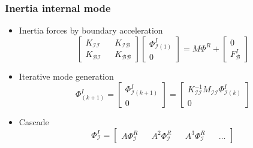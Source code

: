 \documentclass[serif,mathserif, 12pt]{beamer}
\begin{document}
\begin{frame}
  \frametitle{Inertia internal mode}
  \begin{itemize}
  \item Inertia forces by boundary acceleration
    \begin{equation*}
      \begin{bmatrix}
        K_{\mathcal{II}} && K_{\mathcal{IB}} \\
        K_{\mathcal{BI}} && K_{\mathcal{BB}}
      \end{bmatrix}
      \begin{bmatrix}
        \Phi_{\mathcal{I}(1)}^I \\
        0
      \end{bmatrix}
      =
      M\Phi^R+
      \begin{bmatrix}
        0 \\
        F_\mathcal{B}^I
      \end{bmatrix}
    \end{equation*}
  \item Iterative mode generation
    \begin{equation*}
      \Phi_{(k+1)}^I =
      \begin{bmatrix}
        \Phi^I_{\mathcal{I}(k+1)} \\
        0
      \end{bmatrix}
      =
      \begin{bmatrix}
        K^{-1}_{\mathcal{II}}M_{\mathcal{II}}\Phi^I_{\mathcal{I}(k)} \\
        0
      \end{bmatrix}
    \end{equation*}
  \item Cascade
    \begin{equation*}
      \Phi_{\mathcal{I}}^I =
      \begin{bmatrix}
        A\Phi_\mathcal{I}^R &&  A^2\Phi_\mathcal{I}^R &&  A^3\Phi_\mathcal{I}^R && \dots
      \end{bmatrix}
    \end{equation*}
  \end{itemize}
\end{frame}
\end{document}
